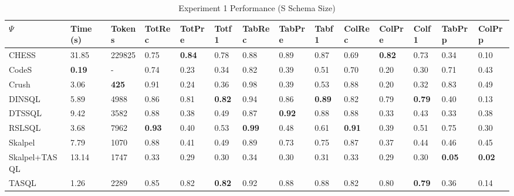 \begin{table*}
\caption{Experiment 1 Performance (S Schema Size)}
\label{tab:exp1-s-schema}
\begin{tabular}{llllllllllllll}
\toprule
$\Psi$ & Time (s) & Tokens & TotRec & TotPre & Totf1 & TabRec & TabPre & Tabf1 & ColRec & ColPre & Colf1 & TabPrp & ColPrp \\
\midrule
CHESS & 31.85 & 229825 & 0.75 & \textbf{0.84} & 0.78 & 0.88 & 0.89 & 0.87 & 0.69 & \textbf{0.82} & 0.73 & 0.34 & 0.10 \\
CodeS & \textbf{0.19} & - & 0.74 & 0.23 & 0.34 & 0.82 & 0.39 & 0.51 & 0.70 & 0.20 & 0.30 & 0.71 & 0.43 \\
Crush & 3.06 & \textbf{425} & 0.91 & 0.24 & 0.36 & 0.98 & 0.39 & 0.53 & 0.88 & 0.20 & 0.32 & 0.83 & 0.49 \\
DINSQL & 5.89 & 4988 & 0.86 & 0.81 & \textbf{0.82} & 0.94 & 0.86 & \textbf{0.89} & 0.82 & 0.79 & \textbf{0.79} & 0.40 & 0.13 \\
DTSSQL & 9.42 & 3582 & 0.88 & 0.38 & 0.49 & 0.87 & \textbf{0.92} & 0.88 & 0.88 & 0.33 & 0.43 & 0.33 & 0.38 \\
RSLSQL & 3.68 & 7962 & \textbf{0.93} & 0.40 & 0.53 & \textbf{0.99} & 0.48 & 0.61 & \textbf{0.91} & 0.39 & 0.51 & 0.75 & 0.30 \\
Skalpel & 7.79 & 1070 & 0.88 & 0.41 & 0.49 & 0.89 & 0.73 & 0.75 & 0.87 & 0.37 & 0.44 & 0.46 & 0.45 \\
Skalpel+TASQL & 13.14 & 1747 & 0.33 & 0.29 & 0.30 & 0.34 & 0.30 & 0.31 & 0.33 & 0.29 & 0.30 & \textbf{0.05} & \textbf{0.02} \\
TASQL & 1.26 & 2289 & 0.85 & 0.82 & \textbf{0.82} & 0.92 & 0.88 & 0.88 & 0.82 & 0.80 & \textbf{0.79} & 0.36 & 0.14 \\
\bottomrule
\end{tabular}
\end{table*}
